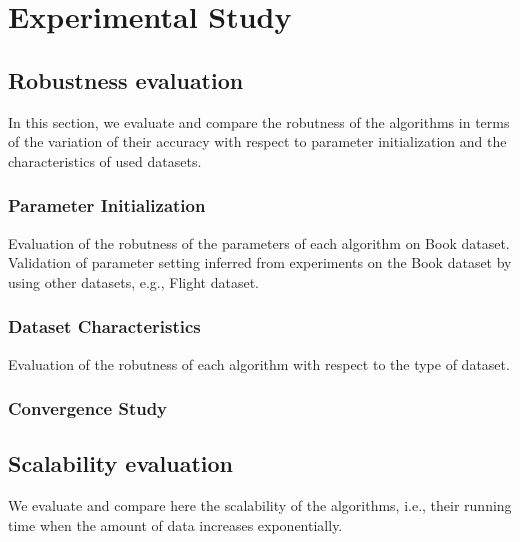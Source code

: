 \section{Experimental Study}

\subsection{Robustness evaluation}
In this section, we evaluate and compare the robutness of the algorithms
in terms of the variation of their accuracy with respect to parameter initialization
and the characteristics of used datasets.

\subsubsection{Parameter Initialization}
Evaluation of the robutness of the parameters of each algorithm on Book dataset.
Validation of parameter setting inferred from experiments on the Book
dataset by using other datasets, e.g., Flight dataset. 

\subsubsection{Dataset Characteristics}
Evaluation of the robutness of each algorithm with respect to the type of dataset.

\subsubsection{Convergence Study}

\subsection{Scalability evaluation}
We evaluate and compare here the scalability of the algorithms, i.e., their
running time when the amount of data increases exponentially.


